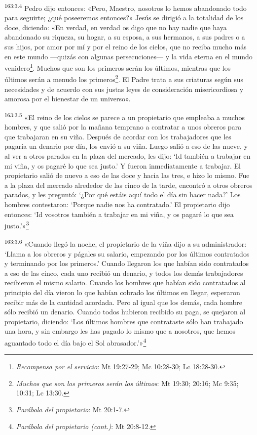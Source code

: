 \par 
\textsuperscript{163:3.4} Pedro dijo entonces: «Pero, Maestro, nosotros lo hemos abandonado todo para seguirte; ¿qué poseeremos entonces?» Jesús se dirigió a la totalidad de los doce, diciendo: «En verdad, en verdad os digo que no hay nadie que haya abandonado su riqueza, su hogar, a su esposa, a sus hermanos, a sus padres o a sus hijos, por amor por mí y por el reino de los cielos, que no reciba mucho más en este mundo ---quizás con algunas persecuciones--- y la vida eterna en el mundo venidero\footnote{\textit{Recompensa por el servicio}: Mt 19:27-29; Mc 10:28-30; Lc 18:28-30.}. Muchos que son los primeros serán los últimos, mientras que los últimos serán a menudo los primeros\footnote{\textit{Muchos que son los primeros serán los últimos}: Mt 19:30; 20:16; Mc 9:35; 10:31; Lc 13:30.}. El Padre trata a sus criaturas según sus necesidades y de acuerdo con sus justas leyes de consideración misericordiosa y amorosa por el bienestar de un universo».

\par 
\textsuperscript{163:3.5} «El reino de los cielos se parece a un propietario que empleaba a muchos hombres, y que salió por la mañana temprano a contratar a unos obreros para que trabajaran en su viña. Después de acordar con los trabajadores que les pagaría un denario por día, los envió a su viña. Luego salió a eso de las nueve, y al ver a otros parados en la plaza del mercado, les dijo: `Id también a trabajar en mi viña, y os pagaré lo que sea justo.' Y fueron inmediatamente a trabajar. El propietario salió de nuevo a eso de las doce y hacia las tres, e hizo lo mismo. Fue a la plaza del mercado alrededor de las cinco de la tarde, encontró a otros obreros parados, y les preguntó: `¿Por qué estáis aquí todo el día sin hacer nada?' Los hombres contestaron: `Porque nadie nos ha contratado.' El propietario dijo entonces: `Id vosotros también a trabajar en mi viña, y os pagaré lo que sea justo.'»\footnote{\textit{Parábola del propietario}: Mt 20:1-7.}

\par 
\textsuperscript{163:3.6} «Cuando llegó la noche, el propietario de la viña dijo a su administrador: `Llama a los obreros y págales su salario, empezando por los últimos contratados y terminando por los primeros.' Cuando llegaron los que habían sido contratados a eso de las cinco, cada uno recibió un denario, y todos los demás trabajadores recibieron el mismo salario. Cuando los hombres que habían sido contratados al principio del día vieron lo que habían cobrado los últimos en llegar, esperaron recibir más de la cantidad acordada. Pero al igual que los demás, cada hombre sólo recibió un denario. Cuando todos hubieron recibido su paga, se quejaron al propietario, diciendo: `Los últimos hombres que contrataste sólo han trabajado una hora, y sin embargo les has pagado lo mismo que a nosotros, que hemos aguantado todo el día bajo el Sol abrasador.'»\footnote{\textit{Parábola del propietario (cont.)}: Mt 20:8-12.}

